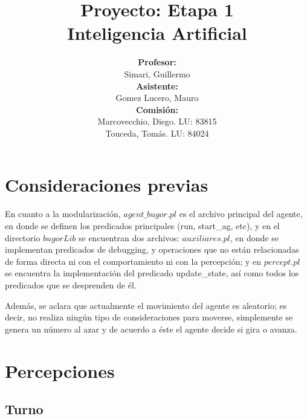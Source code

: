 \documentclass[a4paper,10pt,spanish]{article}
\begin{document}
\begin{titlepage}

\title{{\bf Proyecto: Etapa 1}\\ Inteligencia Artificial\vspace{10mm}}
\author{{\bf Profesor:}\\ Simari, Guillermo\\
{\bf Asistente:}\\ Gomez Lucero, Mauro\\
{\bf Comisi\'on:}\\ Marcovecchio, Diego. LU: 83815\\ Touceda, Tom\'as. LU: 84024}
\date{}

\maketitle

\thispagestyle{empty}

\end{titlepage}

\newpage

\tableofcontents

\newpage

\section{Consideraciones previas}

	En cuanto a la modularizaci\'on, $agent\_bugor.pl$ es el archivo principal del agente, en donde se definen los predicados principales (run, start\_ag, etc), y en el directorio $bugorLib$ se encuentran dos archivos: $auxiliares.pl$, en donde se implementan predicados de debugging, y operaciones que no est\'an relacionadas de forma directa ni con el comportamiento ni con la percepci\'on; y en $percept.pl$ se encuentra la implementaci\'on del predicado update\_state, as\'i como todos los predicados que se desprenden de \'el.

	Adem\'as, se aclara que actualmente el movimiento del agente es aleatorio; es decir, no realiza ning\'un tipo de consideraciones para moverse, simplemente se genera un n\'umero al azar y de acuerdo a \'este el agente decide si gira o avanza.

\section{Percepciones}
	\subsection{Turno}
	
\end{document}
